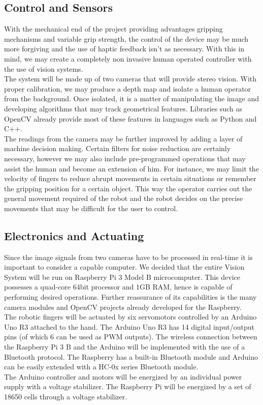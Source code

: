 \documentclass{article}
\begin{document}
\subsection{Control and Sensors}

With the mechanical end of the project providing advantages gripping mechanisms and variable grip strength, the control of the device may be much more forgiving and the use of haptic feedback isn't as necessary. With this in mind, we may create a completely non invasive human operated controller with the use of vision systems. \\[12pt]
\indent The system will be made up of two cameras that will provide stereo vision. With proper calibration, we may produce a depth map and isolate a human operator from the background. Once isolated, it is a matter of manipulating the image and developing algorithms that may track geometrical features. Libraries such as OpenCV already provide most of these features in languages such as Python and C++. \\[12pt]
\indent The readings from the camera may be further improved by adding a layer of machine decision making. Certain filters for noise reduction are certainly necessary, however we may also include pre-programmed operations that may assist the human and become an extension of him. For instance, we may limit the velocity of fingers to reduce abrupt movements in certain situations or remember the gripping position for a certain object. This way the operator carries out the general movement required of the robot and the robot decides on the precise movements that may be difficult for the user to control. 

\subsection{Electronics and Actuating}

Since the image signals from two cameras have to be processed in real-time it is important to consider a capable computer. We decided that the entire Vision System will be run on Raspberry Pi 3 Model B microcomputer. This device possesses a quad-core 64bit processor and 1GB RAM, hence is capable of performing desired operations. Further reassurance of its capabilities is the many camera modules and OpenCV projects already developed for the Raspberry.\\[12pt]
\indent The robotic fingers will be actuated by six servomotors controlled by an Arduino Uno R3 attached to the hand. The Arduino Uno R3 has 14 digital input/output pins (of which 6 can be used as PWM outputs). The wireless connection between the Raspberry Pi 3 B and the Arduino will be implemented with the use of a Bluetooth protocol. The Raspberry has a built-in Bluetooth module and Arduino can be easily extended with a HC-0x series Bluetooth module.\\[12pt] 
\indent	The Arduino controller and motors will be energized by an individual power supply with a voltage stabilizer. The Raspberry Pi will be energized by a set of 18650 cells through a voltage stabilizer.
\end{document}
